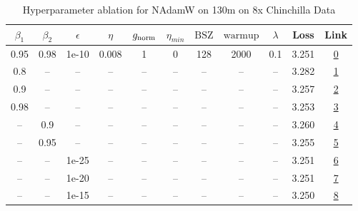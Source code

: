\begin{table}[H]
\centering
\caption{Hyperparameter ablation for NAdamW on 130m on 8x Chinchilla Data}
\label{tab:ablation_nadamw_130m_on_8x_chinchilla_data}
\begin{tabular}{ccccccccccc}
\toprule
$\beta_1$ & $\beta_2$ & $\epsilon$ & $\eta$ & $g_{\mathrm{norm}}$ & $\eta_{min}$ & $\mathrm{BSZ}$ & $\mathrm{warmup}$ & $\lambda$ & Loss & Link \\
\midrule
0.95 & 0.98 & 1e-10 & 0.008 & 1 & 0 & 128 & 2000 & 0.1 & 3.251 & \href{https://wandb.ai/marin-community/optimizer-scaling/runs/sweep-130m-21B-nadamw6383f8lr0.008-wd0.1-minlr0-warmup2000-b10.9-044a64}{0} \\
\midrule
0.8 & -- & -- & -- & -- & -- & -- & -- & -- & 3.282 & \href{https://wandb.ai/marin-community/optimizer-scaling/runs/sweep-130m-21B-nadamwc92c72lr0.008-wd0.1-minlr0-warmup2000-b10.8-2c8117}{1} \\
0.9 & -- & -- & -- & -- & -- & -- & -- & -- & 3.257 & \href{https://wandb.ai/marin-community/optimizer-scaling/runs/sweep-130m-21B-nadamwb1139dlr0.008-wd0.1-minlr0-warmup2000-b10.9-a22589}{2} \\
0.98 & -- & -- & -- & -- & -- & -- & -- & -- & 3.253 & \href{https://wandb.ai/marin-community/optimizer-scaling/runs/sweep-130m-21B-nadamw532224lr0.008-wd0.1-minlr0-warmup2000-b10.9-a9e22e}{3} \\
-- & 0.9 & -- & -- & -- & -- & -- & -- & -- & 3.260 & \href{https://wandb.ai/marin-community/optimizer-scaling/runs/sweep-130m-21B-nadamwebc3a7lr0.008-wd0.1-minlr0-warmup2000-b10.9-2d9521}{4} \\
-- & 0.95 & -- & -- & -- & -- & -- & -- & -- & 3.255 & \href{https://wandb.ai/marin-community/optimizer-scaling/runs/sweep-130m-21B-nadamw6a5715lr0.008-wd0.1-minlr0-warmup2000-b10.9-c46dee}{5} \\
-- & -- & 1e-25 & -- & -- & -- & -- & -- & -- & 3.251 & \href{https://wandb.ai/marin-community/optimizer-scaling/runs/sweep-130m-21B-nadamw47eb94lr0.008-wd0.1-minlr0-warmup2000-b10.9-d49c15}{6} \\
-- & -- & 1e-20 & -- & -- & -- & -- & -- & -- & 3.251 & \href{https://wandb.ai/marin-community/optimizer-scaling/runs/sweep-130m-21B-nadamwf3b7d9lr0.008-wd0.1-minlr0-warmup2000-b10.9-0f4c2b}{7} \\
-- & -- & 1e-15 & -- & -- & -- & -- & -- & -- & 3.250 & \href{https://wandb.ai/marin-community/optimizer-scaling/runs/sweep-130m-21B-nadamw532daalr0.008-wd0.1-minlr0-warmup2000-b10.9-18ddc4}{8} \\

\end{tabular}
\end{table}
